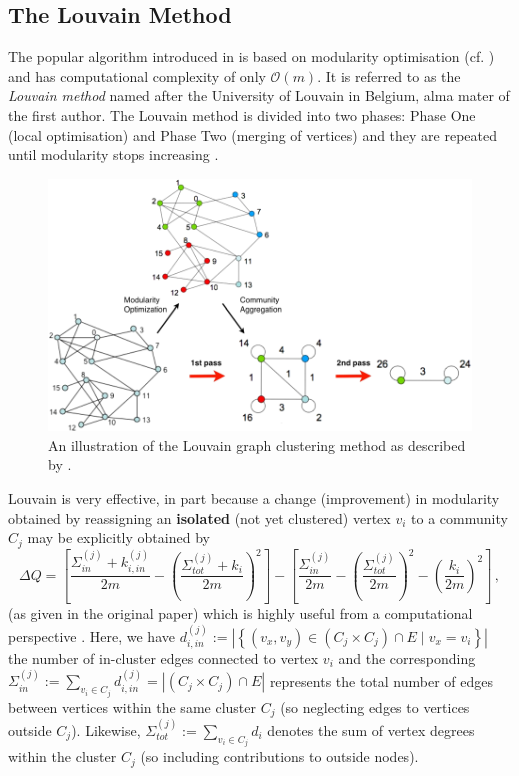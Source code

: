 \documentclass[12pt, a4paper]{article}
\begin{document}
  \subsection{The Louvain Method}
  The popular algorithm introduced in \cite{lambiotte-louvain-clustering} is based on modularity optimisation (cf. ) and has computational complexity of only $\mathcal{O}(m)$.
  It is referred to as the \textit{Louvain method} named after the University of Louvain in Belgium, alma mater of the first author.
  The Louvain method is divided into two phases: Phase One (local optimisation) and Phase Two (merging of vertices) and they are repeated until modularity stops increasing \parencite{lambiotte-louvain-clustering}.

  \begin{figure}[H]
    \centering
    \includegraphics[width=\linewidth]{figures/blondel.png}
    \caption{An illustration of the Louvain graph clustering method as described by \cite{lambiotte-louvain-clustering}.}
  \end{figure}

  Louvain is very effective, in part because a change (improvement) in modularity obtained by reassigning an \textbf{isolated} (not yet clustered) vertex $v_i$ to a community $C_j$ may be explicitly obtained by
  \begin{equation}
    \Delta Q=\left[ \frac{\Sigma_{in}^{(j)} + k_{i,in}^{(j)}}{2 m} - \left(\frac{\Sigma_{tot}^{(j)} + k_{i}}{2m}\right)^2 \right] - \left[ \frac{\Sigma_{in}^{(j)}}{2m} - \left(\frac{\Sigma_{tot}^{(j)}}{2m}\right)^2 - \left(\frac{k_i}{2m}\right)^2 \right] \,,
    \label{eq:blondel-deltaQ}
  \end{equation}
  (as given in the original paper) which is highly useful from a computational perspective \parencite{lambiotte-louvain-clustering}.
  Here, we have $d_{i,in}^{(j)} := \left|\left\{(v_x, v_y) \in (C_j \times C_j) \cap E \;\big|\; v_x = v_i\right\}\right|$ the number of in-cluster edges connected to vertex $v_i$ and the corresponding $\Sigma_{in}^{(j)} := \sum_{v_i \in C_j} d_{i,in}^{(j)} = \left|(C_j \times C_j) \cap E\right|$ represents the total number of edges between vertices within the same cluster $C_j$ (so neglecting edges to vertices outside $C_j$).
  Likewise, $\Sigma_{tot}^{(j)} := \sum_{v_i \in C_j} d_i$ denotes the sum of vertex degrees within the cluster $C_j$ (so including contributions to outside nodes).
\end{document}
